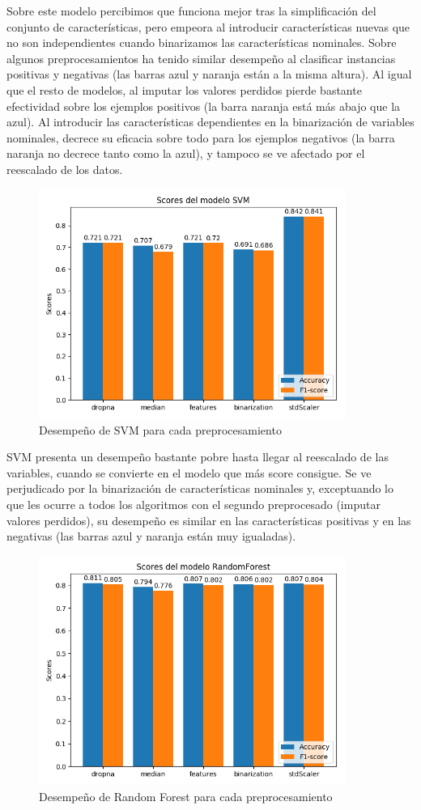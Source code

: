 \documentclass[oneside]{book}
\begin{document}
Sobre este modelo percibimos que funciona mejor tras la simplificación
del conjunto de características, pero empeora al introducir
características nuevas que no son independientes cuando binarizamos
las características nominales. Sobre algunos preprocesamientos ha
tenido similar desempeño al clasificar instancias positivas y
negativas (las barras azul y naranja están a la misma altura). Al
igual que el resto de modelos, al imputar los valores perdidos pierde
bastante efectividad sobre los ejemplos positivos (la barra naranja
está más abajo que la azul). Al introducir las características
dependientes en la binarización de variables nominales, decrece su
eficacia sobre todo para los ejemplos negativos (la barra naranja no
decrece tanto como la azul), y tampoco se ve afectado por el
reescalado de los datos.

\begin{figure}[H]
  \centering
  \caption{Desempeño de SVM para cada preprocesamiento}
  \label{fig:svm}
  \includegraphics[width=100mm]{figures/visualizacion/svm}
\end{figure}

SVM presenta un desempeño bastante pobre hasta llegar al reescalado de
las variables, cuando se convierte en el modelo que más score
consigue. Se ve perjudicado por la binarización de características
nominales y, exceptuando lo que les ocurre a todos los algoritmos con
el segundo preprocesado (imputar valores perdidos), su desempeño es
similar en las características positivas y en las negativas (las
barras azul y naranja están muy igualadas).

\begin{figure}[H]
  \centering
  \caption{Desempeño de Random Forest para cada preprocesamiento}
  \label{fig:rf}
  \includegraphics[width=100mm]{figures/visualizacion/randomForest}
\end{figure}
\end{document}
